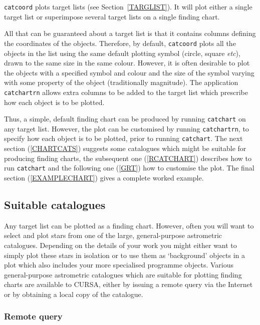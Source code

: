 \documentclass[twoside,11pt]{starlink}
\begin{document}
\texttt{catcoord} plots target lists (see Section~\ref{TARGLIST}).  It will
plot either a single target list or superimpose several target lists on
a single finding chart.

All that can be guaranteed about a target list is that it contains
columns defining the coordinates of the objects.  Therefore, by default,
\texttt{catcoord} plots all the objects in the list using the same default
plotting symbol (circle, square \emph{etc}\/), drawn to the same size in
the same colour.  However, it is often desirable to plot the objects with
a specified symbol and colour and the size of the symbol varying with some
property of the object (traditionally magnitude).  The application \texttt{catchartrn} allows extra columns to be added to the target list which
prescribe how each object is to be plotted.

Thus, a simple, default finding chart can be produced by running \texttt{catchart} on any target list.  However, the plot can be customised
by running \texttt{catchartrn}, to specify how each object is to be plotted,
prior to running \texttt{catchart}.  The next section (\ref{CHARTCATS})
suggests some catalogues which might be suitable for producing finding
charts, the subsequent one (\ref{RCATCHART}) describes how to run \texttt{catchart} and the following one (\ref{GRT}) how to customise the plot.
The final section (\ref{EXAMPLECHART}) gives a complete worked example.

\subsection{\label{CHARTCATS}Suitable catalogues}

Any target list can be plotted as a finding chart.  However, often you
will want to select and plot stars from one of the large, general-purpose
astrometric catalogues.  Depending on the details of your work you might
either want to simply plot these stars in isolation or to use them as
`background' objects in a plot which also includes your more specialised
programme objects.  Various general-purpose astrometric catalogues which
are suitable for plotting finding charts are available to CURSA, either
by issuing a remote query via the Internet or by obtaining a local
copy of the catalogue.

\subsubsection{Remote query}
\end{document}

